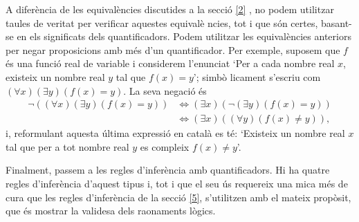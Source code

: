 A difer\`{e}ncia de les equival\`{e}ncies discutides a la secci\'{o} \ref{2}%
, no podem utilitzar taules de veritat per verificar aquestes equival\`{e}%
ncies, tot i que s\'{o}n certes, basant-se en els significats dels
quantificadors. Podem utilitzar les equival\`{e}ncies anteriors per negar
proposicions amb m\'{e}s d'un quantificador. Per exemple, suposem que $f$
\'{e}s una funci\'{o} real de variable i considerem l'enunciat `Per a cada
nombre real $x$, existeix un nombre real $y$ tal que $f(x)=y$'; simb\`{o}%
licament s'escriu com $\left( \forall x\right) \left( \exists y\right)
\left( f(x)=y\right) $. La seva negaci\'{o} \'{e}s%
\begin{align*}
\lnot\left( \left( \forall x\right) \left( \exists y\right) \left(
f(x)=y\right) \right) & \Longleftrightarrow\left( \exists x\right) \left(
\lnot\left( \exists y\right) \left( f(x)=y\right) \right) \\
& \Longleftrightarrow\left( \exists x\right) \left( \left( \forall y\right)
\left( f(x)\neq y\right) \right) \text{,}
\end{align*}
i, reformulant aquesta \'{u}ltima expressi\'{o} en catal\`{a} es t\'{e}:
`Existeix un nombre real $x$ tal que per a tot nombre real $y$ es compleix $%
f(x)\neq y$'.

\bigskip

Finalment, passem a les regles d'infer\`{e}ncia amb quantificadors. Hi ha
quatre regles d'infer\`{e}ncia d'aquest tipus i, tot i que el seu \'{u}s
requereix una mica m\'{e}s de cura que les regles d'infer\`{e}ncia de la
secci\'{o} \ref{5}, s'utilitzen amb el mateix prop\`{o}sit, que \'{e}s
mostrar la validesa dels raonaments l\`{o}gics.

